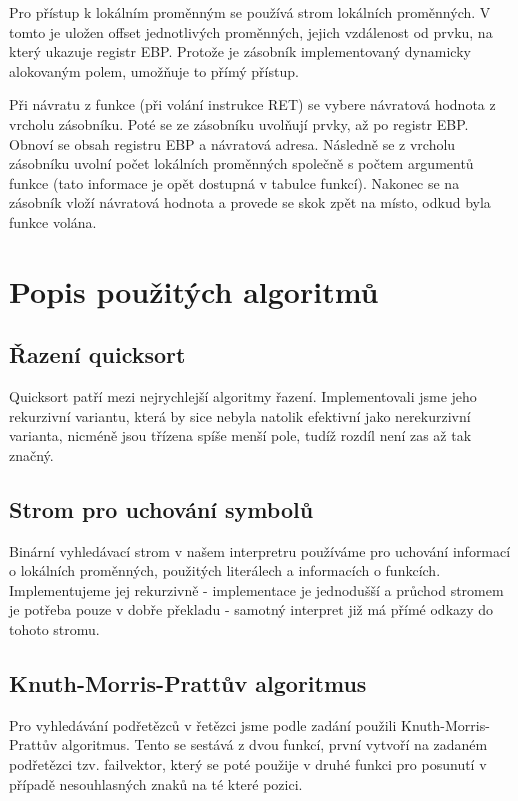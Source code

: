 \documentclass[a4paper,11pt,titlepage]{article}
\begin{document}
Pro přístup k lokálním proměnným se používá strom lokálních pro\-měn\-ných. V tomto je uložen offset jednotlivých proměnných, jejich vzdálenost od prvku, na který ukazuje registr EBP. Protože je zásobník implementovaný dynamicky alokovaným polem, umožňuje to přímý přístup.


Při návratu z funkce (při volání instrukce RET) se vybere návratová hodnota z vrcholu zásobníku. Poté se ze zásobníku uvolňují prvky, až po registr EBP. Obnoví se obsah registru EBP a návratová adresa. Následně se z vrcholu zásobníku uvolní počet lokálních proměnných společně s počtem argumentů funkce (tato informace je opět dostupná v tabulce funkcí). Nakonec se na zásobník vloží návratová hodnota a provede se skok zpět na místo, odkud byla funkce volána.

\section{Popis použitých algoritmů}

\subsection{Řazení quicksort}

Quicksort patří mezi nejrychlejší algoritmy řazení. Implementovali jsme jeho rekurzivní variantu, která by sice nebyla natolik efektivní jako nerekurzivní varianta, nicméně jsou třízena spíše menší pole, tudíž rozdíl není zas až tak značný.

\subsection{Strom pro uchování symbolů}

Binární vyhledávací strom v našem interpretru používáme pro u\-cho\-vá\-ní informací o lokálních proměnných, použitých literálech a informacích o funk\-cích. Implementujeme jej rekurzivně - implementace je jednodušší a průchod stromem je potřeba pouze v dobře překladu - samotný interpret již má přímé odkazy do tohoto stromu.

\subsection{Knuth-Morris-Prattův algoritmus}

Pro vyhledávání podřetězců v řetězci jsme podle zadání použili Knuth-Morris-Prattův algoritmus. Tento se sestává z dvou funkcí, první vytvoří na zadaném podřetězci tzv. failvektor, který se poté použije v druhé funkci pro posunutí v případě nesouhlasných znaků na té které pozici.
\end{document}
